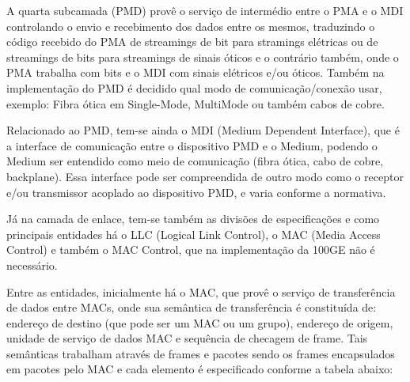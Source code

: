 \documentclass[a4paper,12pt]{article}
\begin{document}
A quarta subcamada (PMD) provê o serviço de intermédio entre o PMA e o MDI controlando o envio e recebimento dos dados entre os mesmos, traduzindo o código recebido do PMA de streamings de bit para stramings elétricas ou de streamings de bits para streamings de sinais óticos e o contrário também, onde o PMA trabalha com bits e o MDI com sinais elétricos e/ou óticos. Também na implementação do PMD é decidido qual modo de comunicação/conexão usar, exemplo: Fibra ótica em Single-Mode, MultiMode ou também cabos de cobre.

Relacionado ao PMD, tem-se ainda o MDI (Medium Dependent Interface), que é a interface de comunicação entre o dispositivo PMD e o Medium, podendo o Medium ser entendido como meio de comunicação (fibra ótica, cabo de cobre, backplane). Essa interface pode ser compreendida de outro modo como o receptor e/ou transmissor acoplado ao dispositivo PMD, e varia conforme a normativa.

Já na camada de enlace, tem-se também as divisões de especificações e como principais entidades há o LLC (Logical Link Control), o MAC (Media Access Control) e também o MAC Control, que na implementação da 100GE não é necessário.

Entre as entidades, inicialmente há o MAC, que provê o serviço de transferência de dados entre MACs, onde sua semântica de transferência é constituída de: endereço de destino (que pode ser um MAC ou um grupo), endereço de origem, unidade de serviço de dados MAC e sequência de checagem de frame.
Tais semânticas trabalham através de frames e pacotes sendo os frames encapsulados em pacotes pelo MAC e cada elemento é especificado conforme a tabela abaixo:
\end{document}
